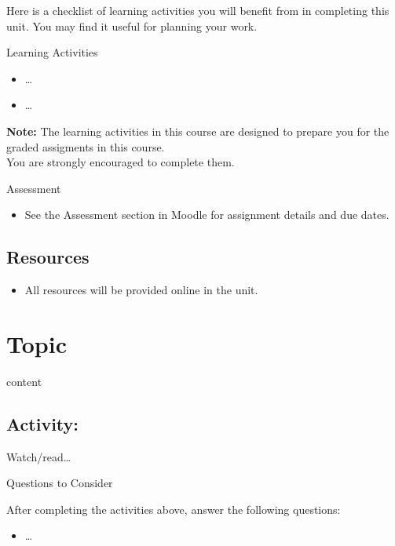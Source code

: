 \documentclass[
]{book}
\providecommand{\tightlist}{%
  \setlength{\itemsep}{0pt}\setlength{\parskip}{0pt}}
\theoremstyle{definition}
\theoremstyle{definition}
\theoremstyle{definition}
\theoremstyle{definition}
\theoremstyle{remark}
\begin{document}
Here is a checklist of learning activities you will benefit from in completing this unit. You may find it useful for planning your work.

\begin{reflect}
{Learning Activities}

\begin{itemize}
\tightlist
\item
  \ldots{}
\item
  \ldots{}
\end{itemize}

\textbf{Note:} The learning activities in this course are designed to prepare you for the graded assigments in this course.\\
You are strongly encouraged to complete them.
\end{reflect}

\begin{assessment}
{Assessment}

\begin{itemize}
\tightlist
\item
  See the Assessment section in Moodle for assignment details and due dates.
\end{itemize}
\end{assessment}

\hypertarget{resources-2}{%
\subsection*{Resources}\label{resources-2}}

\begin{itemize}
\tightlist
\item
  All resources will be provided online in the unit.
\end{itemize}

\hypertarget{topic-3}{%
\section{Topic}\label{topic-3}}

content

\hypertarget{activity-7}{%
\subsection*{Activity:}\label{activity-7}}

\begin{reflect}
Watch/read\ldots{}

{Questions to Consider}

After completing the activities above, answer the following questions:

\begin{itemize}
\tightlist
\item
  \ldots{}
\end{itemize}
\end{reflect}
\end{document}
